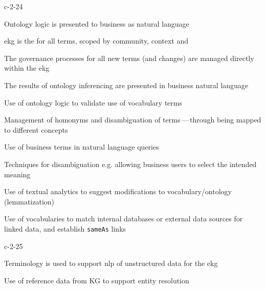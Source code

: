 \begin{level-assessment}{c-2-2}{4}

  \item Ontology logic is presented to business as natural language
  \item \Gls{ekg} is the  for all terms, scoped by community, context and 
  \item The governance processes for all new terms (and changes) are managed directly within the \gls{ekg}
  \item The results of ontology inferencing are presented in business natural language
  \item Use of ontology logic to validate use of vocabulary terms
  \item Management of homonyms and disambiguation of terms\,---\,through being mapped to different concepts
  \item Use of business terms in natural language queries
  \item Techniques for disambiguation e.g. allowing business users to select the intended meaning
  \item Use of textual analytics to suggest modifications to vocabulary/ontology (lemmatization)
  \item Use of vocabularies to match internal databases or external data sources for linked data,
        and establish \lstinline|sameAs| links

\end{level-assessment}

\begin{level-assessment}{c-2-2}{5}

  \item Terminology is used to support \gls{nlp} of unstructured data for the \gls{ekg}
  \item Use of reference data from KG to support entity resolution

\end{level-assessment}

